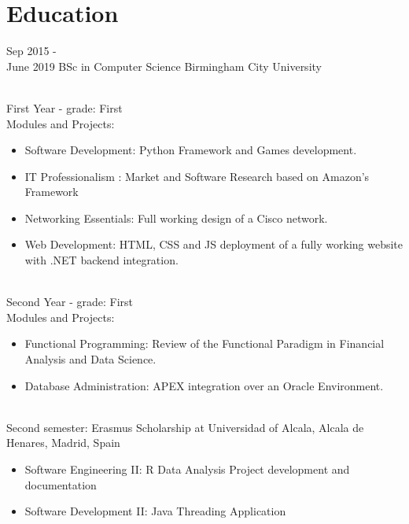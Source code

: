\documentclass[]{friggeri-cv}
\begin{document}
\section{Education}
\begin{entrylist}
  \entry
  {Sep 2015 - \\ June 2019}
  {BSc in Computer Science}
  {Birmingham City University}
  {
    \\First Year - grade: First
    \\Modules and Projects: 
	\begin{itemize}
      \item Software Development: Python Framework and Games development.
      \item IT Professionalism : Market and Software Research based on Amazon's Framework
      \item Networking Essentials: Full working design of a Cisco network.
      \item Web Development: HTML, CSS and JS deployment of a fully working website with .NET backend integration.
    \end{itemize}
    \hfill\break
    \\Second Year - grade: First 
    \\Modules and Projects: 
        \begin{itemize}
            \item Functional Programming: Review of the Functional Paradigm in Financial Analysis and Data Science.
            \item Database Administration: APEX integration over an Oracle Environment.
        \end{itemize}
    \\Second semester: Erasmus Scholarship at Universidad of Alcala, Alcala de Henares, Madrid, Spain 
        \begin{itemize}
            \item Software Engineering II: R Data Analysis Project development and documentation
            \item Software Development II: Java Threading Application
        \end{itemize}
    }
  \end{entrylist}

\newpage
\end{document}
